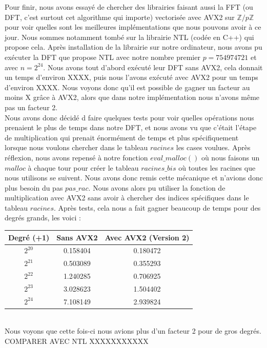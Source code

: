 \documentclass[12pt, a4paper]{article}
\begin{document}
Pour finir, nous avons essayé de chercher des librairies faisant aussi la FFT (ou DFT, c'est surtout cet algorithme qui importe) vectorisée avec AVX2 sur $\mathbb{Z}/p\mathbb{Z}$ pour voir quelles sont les meilleures implémentations que nous pouvons avoir à ce jour. Nous sommes notamment tombé sur la librairie NTL (codée en C++) qui propose cela. Après installation de la librairie sur notre ordinateur, nous avons pu exécuter la DFT que propose NTL avec notre nombre premier $p = 754974721$ et avec $n = 2^{24}$. Nous avons tout d'abord exécuté leur DFT sans AVX2, cela donnait un temps d'environ XXXX, puis nous l'avons exécuté avec AVX2 pour un temps d'environ XXXX. Nous voyons donc qu'il est possible de gagner un facteur au moins X grâce à AVX2, alors que dans notre implémentation nous n'avons même pas un facteur 2. \\
\indent Nous avons donc décidé d faire quelques tests pour voir quelles opérations nous prenaient le plus de temps dans notre DFT, et nous avons vu que c'était l'étape de multiplication qui prenait énormément de temps et plus spécifiquement lorsque nous voulons chercher dans le tableau $racines$ les cases voulues. Après réflexion, nous avons repensé à notre fonction $eval\_malloc()$ où nous faisons un $malloc$ à chaque tour pour créer le tableau $racines\_bis$ où toutes les racines que nous utilisons se suivent. Nous avons donc remis cette mécanique et n'avions donc plus besoin du pas $pas\_rac$. Nous avons alors pu utiliser la fonction de multiplication avec AVX2 sans avoir à chercher des indices spécifiques dans le tableau $racines$. Après tests, cela nous a fait gagner beaucoup de temps pour des degrés grands, les voici : 

\begin{center}
\begin{tabular}{||c c c||}
\hline
Degré (+1) & Sans AVX2 & Avec AVX2 (Version 2) \\
\hline\hline
$2^{20}$ & 0.158404 & 0.180472 \\
\hline
$2^{21}$ & 0.503089 & 0.355293 \\
\hline
$2^{22}$ & 1.240285 & 0.706925 \\
\hline
$2^{23}$ & 3.028623 & 1.504402 \\
\hline
$2^{24}$ & 7.108149 & 2.939824 \\
\hline
\end{tabular}
\end{center}
{}
\ \\
\indent Nous voyons que cette fois-ci nous avions plus d'un facteur 2 pour de gros degrés. COMPARER AVEC NTL XXXXXXXXXXX
\end{document}
